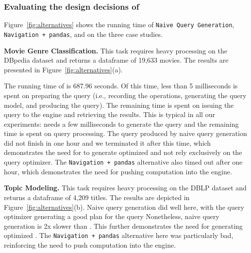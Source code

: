 \subsubsection{Evaluating the design decisions of \rdfframes}

\vspace*{-4pt}
Figure~\ref{fig:alternatives} 
shows the running time of 
\texttt{Naive Query Generation}, \texttt{Navigation + pandas},
and \rdfframes on the three case studies.
 
\vspace{4pt}
\noindent
\textbf{Movie Genre Classification.}
This task requires heavy processing 
on the DBpedia dataset and returns a dataframe of 19,633 movies.
The results are presented in Figure~\ref{fig:alternatives}(a).

The running time of \rdfframes is 687.96 seconds. Of this time, less than 5 milliseconds is spent on
preparing the \sparql query (i.e., recording the \rdfframes operations, generating the query model, and producing the query). The remaining time is spent on issuing the query to the engine and retrieving the results.
This is typical in all our experiments: \rdfframes needs a few milliseconds to generate the \sparql query and the remaining time is spent on query processing. 
The query produced by naive query generation did not finish in one hour and we terminated it after this time,
which demonstrates the need for \rdfframes to generate optimized \sparql and not rely exclusively on the query optimizer.
The \texttt{Navigation + pandas} alternative also timed out after one hour,
which demonstrates the need for pushing computation into the engine.

\vspace{4pt}
\noindent
\textbf{Topic Modeling.}
This task requires heavy processing on the DBLP dataset and returns a dataframe of 4,209 titles.
The results are depicted in Figure~\ref{fig:alternatives}(b).
Naive query generation did well here, with the query optimizer generating a good plan for the query Nonetheless, naive query generation is 2x slower than \rdfframes.
This further demonstrates the need for generating optimized \sparql.
The \texttt{Navigation + pandas} alternative here was particularly bad,
reinforcing the need to push computation into the engine.

